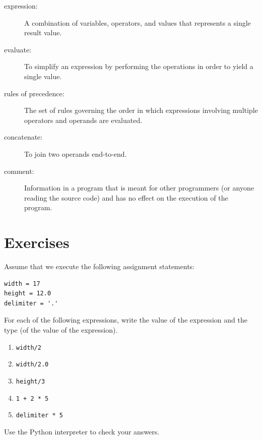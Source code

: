 \documentclass[10pt]{book}
\begin{document}
\begin{description}
\item[expression:]  A combination of variables, operators, and values that
represents a single result value.

\item[evaluate:]  To simplify an expression by performing the operations
in order to yield a single value.

\item[rules of precedence:]  The set of rules governing the order in which
expressions involving multiple operators and operands are evaluated.

\item[concatenate:]  To join two operands end-to-end.

\item[comment:]  Information in a program that is meant for other
programmers (or anyone reading the source code) and has no effect on the
execution of the program.

\end{description}


\section{Exercises}

\begin{ex}
Assume that we execute the following assignment statements:

\begin{verbatim}
width = 17
height = 12.0
delimiter = '.'
\end{verbatim}

For each of the following expressions, write the value of the
expression and the type (of the value of the expression).

\begin{enumerate}

\item {\tt width/2}

\item {\tt width/2.0}

\item {\tt height/3}

\item {\tt 1 + 2 * 5}

\item {\tt delimiter * 5}

\end{enumerate}

Use the Python interpreter to check your answers.
\end{ex}
\end{document}
